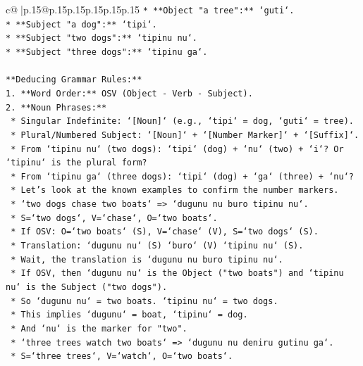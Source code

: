 \documentclass{article}
\begin{document}
{\begin{supertabular}{c@{$\;$}|p{.15\linewidth}@{}p{.15\linewidth}p{.15\linewidth}p{.15\linewidth}p{.15\linewidth}p{.15\linewidth}}
{{{\texttt{*   **Object "a tree":** `guti`.} \\
\texttt{*   **Subject "a dog":** `tipi`.} \\
\texttt{*   **Subject "two dogs":** `tipinu nu`.} \\
\texttt{*   **Subject "three dogs":** `tipinu ga`.} \\
\\ 
\texttt{**Deducing Grammar Rules:**} \\
\texttt{1.  **Word Order:** OSV (Object {-} Verb {-} Subject).} \\
\texttt{2.  **Noun Phrases:**} \\
\texttt{    *   Singular Indefinite: `{[}Noun{]}` (e.g., `tipi` = dog, `guti` = tree).} \\
\texttt{    *   Plural/Numbered Subject: `{[}Noun{]}` + `{[}Number Marker{]}` + `{[}Suffix{]}`.} \\
\texttt{    *   From `tipinu nu` (two dogs): `tipi` (dog) + `nu` (two) + `i`? Or `tipinu` is the plural form?} \\
\texttt{    *   From `tipinu ga` (three dogs): `tipi` (dog) + `ga` (three) + `nu`?} \\
\texttt{    *   Let's look at the known examples to confirm the number markers.} \\
\texttt{    *   `two dogs chase two boats` => `dugunu nu buro tipinu nu`.} \\
\texttt{        *   S=`two dogs`, V=`chase`, O=`two boats`.} \\
\texttt{        *   If OSV: O=`two boats` (S), V=`chase` (V), S=`two dogs` (S).} \\
\texttt{        *   Translation: `dugunu nu` (S) `buro` (V) `tipinu nu` (S).} \\
\texttt{        *   Wait, the translation is `dugunu nu buro tipinu nu`.} \\
\texttt{        *   If OSV, then `dugunu nu` is the Object ("two boats") and `tipinu nu` is the Subject ("two dogs").} \\
\texttt{        *   So `dugunu nu` = two boats. `tipinu nu` = two dogs.} \\
\texttt{        *   This implies `dugunu` = boat, `tipinu` = dog.} \\
\texttt{        *   And `nu` is the marker for "two".} \\
\texttt{    *   `three trees watch two boats` => `dugunu nu deniru gutinu ga`.} \\
\texttt{        *   S=`three trees`, V=`watch`, O=`two boats`.} \\
}}}
\end{supertabular}}
\end{document}
